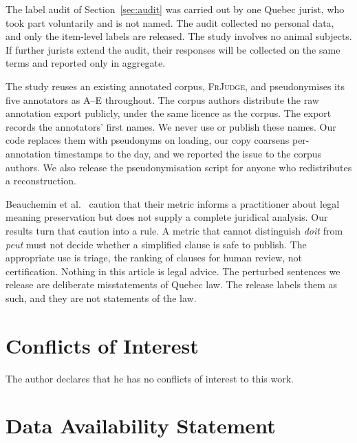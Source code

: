 \documentclass{BVP_JCLLT}
\newcommand{\rev}[1]{#1}
\newcommand{\rev}[1]{{\color{revcol}#1}}
\begin{document}
\rev{The label audit of Section~\ref{sec:audit} was carried out by one Quebec
jurist, who took part voluntarily and is not named. The audit collected no
personal data, and only the item-level labels are released. The study involves
no animal subjects. If further jurists extend the audit, their responses will be
collected on the same terms and reported only in aggregate.

The study reuses an existing annotated corpus, \textsc{FrJudge}, and
pseudonymises its five annotators as A--E throughout. The corpus authors
distribute the raw annotation export publicly, under the same licence as the
corpus. The export records the annotators' first names. We never use or publish
these names. Our code replaces them with pseudonyms on loading, our copy
coarsens per-annotation timestamps to the day, and we reported the issue to the
corpus authors. We also release the pseudonymisation script for anyone who
redistributes a reconstruction.

Beauchemin et al.\ \cite{beauchemin2025judgebert} caution that their metric
informs a practitioner about legal meaning preservation but does not supply a
complete juridical analysis. Our results turn that caution into a rule. A metric
that cannot distinguish \emph{doit} from \emph{peut} must not decide whether a
simplified clause is safe to publish. The appropriate use is triage, the ranking
of clauses for human review, not certification. Nothing in this article is legal
advice. The perturbed sentences we release are deliberate misstatements of Quebec
law. The release labels them as such, and they are not statements of the law.}

\section*{Conflicts of Interest}\label{conflicts-of-interest}

The author declares that he has no conflicts of interest to this work.

\section*{Data Availability Statement}\label{data-availability-statement}
\end{document}
